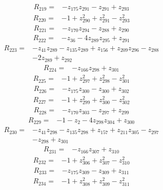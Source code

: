 \begin{align*}
R_{219}={}&-z_{175}z_{291}-z_{291}+z_{293}
\end{align*}
\begin{align*}
R_{220}={}&-1+z_{290}^{2}+z_{291}^{2}-z_{293}^{2}
\end{align*}
\begin{align*}
R_{221}={}&-z_{170}z_{294}-z_{288}+z_{290}
\end{align*}
\begin{align*}
R_{222}={}&-z_{36}-4z_{289}z_{295}+z_{291}
\end{align*}
\begin{align*}
R_{223}={}&-z_{41}z_{289}-z_{135}z_{289}+z_{156}+z_{209}z_{296}-z_{288}\\
&-2z_{289}+z_{292}
\end{align*}
\begin{align*}
R_{224}={}&-z_{166}z_{298}+z_{301}
\end{align*}
\begin{align*}
R_{225}={}&-1+z_{297}^{2}+z_{298}^{2}-z_{301}^{2}
\end{align*}
\begin{align*}
R_{226}={}&-z_{175}z_{300}-z_{300}+z_{302}
\end{align*}
\begin{align*}
R_{227}={}&-1+z_{299}^{2}+z_{300}^{2}-z_{302}^{2}
\end{align*}
\begin{align*}
R_{228}={}&-z_{170}z_{303}-z_{297}+z_{299}
\end{align*}
\begin{align*}
R_{229}={}&-1-z_{2}-4z_{298}z_{304}+z_{300}
\end{align*}
\begin{align*}
R_{230}={}&-z_{41}z_{298}-z_{135}z_{298}+z_{157}+z_{211}z_{305}-z_{297}\\
&-z_{298}+z_{301}
\end{align*}
\begin{align*}
R_{231}={}&-z_{166}z_{307}+z_{310}
\end{align*}
\begin{align*}
R_{232}={}&-1+z_{306}^{2}+z_{307}^{2}-z_{310}^{2}
\end{align*}
\begin{align*}
R_{233}={}&-z_{175}z_{309}-z_{309}+z_{311}
\end{align*}
\begin{align*}
R_{234}={}&-1+z_{308}^{2}+z_{309}^{2}-z_{311}^{2}
\end{align*}
